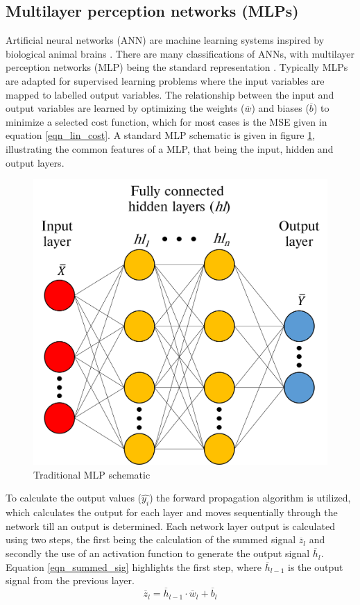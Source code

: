 \documentclass[a4paper,fleqn]{cas-dc}
\begin{document}
\subsection{Multilayer perception networks (MLPs)}
Artificial neural networks (ANN) are machine learning systems inspired by biological animal brains \cite{Rasmussen2006}. There are many classifications of ANNs, with multilayer perception networks (MLP) being the standard representation \citep{goodfellow}. Typically MLPs are adapted for supervised learning problems where the input variables are mapped to labelled output variables. The relationship between the input and output variables are learned by optimizing the weights ($\overline{w}$) and biases ($\overline{b}$) to minimize a selected cost function, which for most cases is the MSE given in equation \ref{eqn_lin_cost}. A standard MLP schematic is given in figure \ref{fig_mlp_schematic}, illustrating the common features of a MLP, that being the input, hidden and output layers.\\
\begin{figure}[h!]
	\centering
		\includegraphics[scale=0.5]{ML_SCHEMATIC}
	  \caption{Traditional MLP schematic}\label{fig_mlp_schematic}
\end{figure}

To calculate the output values ($\hat{y_i}$) the forward propagation algorithm is utilized, which calculates the output for each layer and moves sequentially through the network till an output is determined. Each network layer output is calculated using two steps, the first being the calculation of the summed signal $\overline{z}_l$ and secondly the use of an activation function to generate the output signal $\overline{h}_l$. Equation \ref{eqn_summed_sig} highlights the first step, where $\overline{h}_{l-1}$ is the output signal from the previous layer.
\begin{equation}\label{eqn_summed_sig}
\overline{z}_l = \overline{h}_{l-1}\cdot\overline{w}_l+\overline{b}_l
\end{equation}
\end{document}
